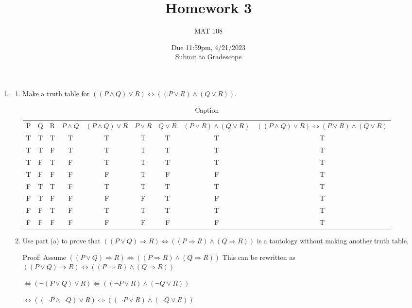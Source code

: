 \documentclass{article}
\title{Homework 3}
\author{MAT 108}
\date{Due 11:59pm, 4/21/2023\\
\vspace{0.1cm}
Submit to Gradescope}
\begin{document}
\maketitle
{\large
\begin{enumerate}[labelindent=0pt,leftmargin=0pt]
\setlength{\itemsep}{13pt}
\item\begin{enumerate}
\item Make a truth table for $((P\land Q)\lor R)\Leftrightarrow
((P\lor R)\land (Q\lor R))$.

\begin{table}[hbt!]
    \centering
    \begin{tabular}{c|c|c|c|c|c|c|c|c}
        P & Q & R & $P \land Q$ & $(P \land Q) \lor R$ & $P \lor R$ & $Q \lor R$ & $(P \lor R) \land (Q \lor R)$ & $((P \land Q) \lor R) \Leftrightarrow (P \lor R) \land (Q \lor R)$ \\
        T & T & T & T & T & T & T & T & T \\
        T & T & F & T & T & T & T & T & T \\
        T & F & T & F & T & T & T & T & T \\
        T & F & F & F & F & T & F & F & T \\
        F & T & T & F & T & T & T & T & T \\
        F & T & F & F & F & F & T & F & T \\
        F & F & T & F & T & T & T & T & T \\
        F & F & F & F & F & F & F & F & T \\
    \end{tabular}
    \caption{Caption}
    \label{tab:my_label}
\end{table}

\item Use part (a) to prove that $((P\lor Q)\Rightarrow
R)\Leftrightarrow ((P\Rightarrow R)\land(Q\Rightarrow R))$ is a tautology
without making another truth table.

Proof: Assume  $((P\lor Q)\Rightarrow R)\Leftrightarrow ((P\Rightarrow R) \land (Q \Rightarrow R))$
This can be rewritten as
$((P \lor Q) \Rightarrow R) \Leftrightarrow ((P \Rightarrow R)\land(Q \Rightarrow R))$

$\Leftrightarrow (\lnot (P \lor Q) \lor R) \Leftrightarrow ((\lnot P \lor R) \land (\lnot Q \lor R))$

$\Leftrightarrow ((\lnot P \land \lnot Q) \lor R) \Leftrightarrow ((\lnot P \lor R) \land (\lnot Q \lor R))$


\end{enumerate}
\end{enumerate}}
\end{document}

